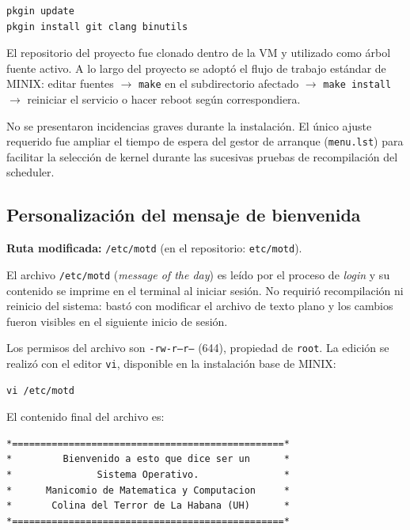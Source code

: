 \documentclass[11pt,a4paper]{article}
\begin{document}
\begin{lstlisting}[style=bashstyle,caption={Instalaci\'on de herramientas de desarrollo en MINIX}]
pkgin update
pkgin install git clang binutils
\end{lstlisting}

El repositorio del proyecto fue clonado dentro de la VM y utilizado como \'arbol fuente activo. A lo largo del proyecto se adopt\'o el flujo de trabajo est\'andar de MINIX: editar fuentes $\to$ \texttt{make} en el subdirectorio afectado $\to$ \texttt{make install} $\to$ reiniciar el servicio o hacer reboot seg\'un correspondiera.

No se presentaron incidencias graves durante la instalaci\'on. El \'unico ajuste requerido fue ampliar el tiempo de espera del gestor de arranque (\texttt{menu.lst}) para facilitar la selecci\'on de kernel durante las sucesivas pruebas de recompilaci\'on del scheduler.

\subsection{Personalizaci\'on del mensaje de bienvenida}

\textbf{Ruta modificada:} \texttt{/etc/motd} (en el repositorio: \texttt{etc/motd}).

El archivo \texttt{/etc/motd} (\emph{message of the day}) es le\'ido por el proceso de \emph{login} y su contenido se imprime en el terminal al iniciar sesi\'on. No requiri\'o recompilaci\'on ni reinicio del sistema: bast\'o con modificar el archivo de texto plano y los cambios fueron visibles en el siguiente inicio de sesi\'on.

Los permisos del archivo son \texttt{-rw-r--r--} (644), propiedad de \texttt{root}. La edici\'on se realiz\'o con el editor \texttt{vi}, disponible en la instalaci\'on base de MINIX:

\begin{lstlisting}[style=bashstyle,caption={Edici\'on del mensaje de bienvenida como root}]
vi /etc/motd
\end{lstlisting}

El contenido final del archivo es:

\begin{lstlisting}[style=bashstyle,caption={Contenido de \texttt{/etc/motd}}]
*================================================*
*         Bienvenido a esto que dice ser un      *
*               Sistema Operativo.               *
*      Manicomio de Matematica y Computacion     *
*       Colina del Terror de La Habana (UH)      *
*================================================*
\end{lstlisting}
\end{document}
